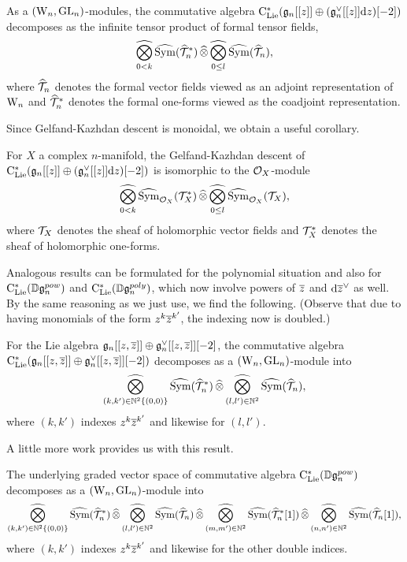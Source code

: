 \begin{lemma}
As a $({{\rm W}_n},{\rm GL}_n)$-modules, the commutative algebra ${\rm C}_{\rm Lie}^*(\mathfrak{g}_n[[z]] \oplus (\mathfrak{g}_n^\vee[[z]]{\rm d} z)[-2])$ 
decomposes as the infinite tensor product of formal tensor fields,
\[
\underset{{0<k}}{\widehat{\bigotimes}}\,\widehat{{\rm Sym}}(\widehat{\mathcal T}^*_n)\, \widehat{\otimes}\, \underset{{0\leq l}}{\widehat{\bigotimes}}\,\widehat{{\rm Sym}}(\widehat{\mathcal T}_n),
\]
where $\widehat{\mathcal T}_n$ denotes the formal vector fields viewed as an adjoint representation of ${{\rm W}_n}$ and 
$\widehat{\mathcal T}^*_n$ denotes the formal one-forms viewed as the coadjoint representation.
\end{lemma}

Since Gelfand-Kazhdan descent is monoidal, we obtain a useful corollary.

\begin{cor}
\label{lem g[[z]]}
For $X$ a complex $n$-manifold, the Gelfand-Kazhdan descent of ${\rm C}_{\rm Lie}^*(\mathfrak{g}_n[[z]] \oplus (\mathfrak{g}_n^\vee[[z]]{\rm d} z)[-2])$
is isomorphic to the $\mathcal O_X$-module
\[
\underset{{0<k}}{\widehat{\bigotimes}}\,\widehat{{\rm Sym}}_{\mathcal O_X}(\mathcal T^*_X)\, \widehat{\otimes}\, \underset{{0\leq l}}{\widehat{\bigotimes}}\,\widehat{{\rm Sym}}_{\mathcal O_X}(\mathcal T_X),
\]
where $\mathcal T_X$ denotes the sheaf of holomorphic vector fields and $\mathcal T^*_X$ denotes the sheaf of holomorphic one-forms.
\end{cor}

Analogous results can be formulated for the polynomial situation 
and also for ${\rm C}_{\rm Lie}^*(\mathbb D\mathfrak{g}_n^{pow})$ and ${\rm C}_{\rm Lie}^*(\mathbb D\mathfrak{g}_n^{poly})$,
which now involve powers of $\overline{z}$ and ${\rm d} \overline{z}^\vee$ as well.
By the same reasoning as we just use, we find the following.
(Observe that due to having monomials of the form $z^k \overline{z}^{k'}$,
the indexing now is doubled.)

\begin{lemma}
For the Lie algebra $\mathfrak{g}_n[[z,\overline{z}]] \oplus \mathfrak{g}_n^\vee[[z,\overline{z}]][-2]$,
the commutative algebra ${\rm C}_{\rm Lie}^*(\mathfrak{g}_n[[z,\overline{z}]] \oplus \mathfrak{g}_n^\vee[[z,\overline{z}]][-2])$ decomposes as a $({{\rm W}_n},{\rm GL}_n)$-module
into
\[
\underset{{(k,k') \in \mathbb N^2 \{(0,0)\}}}{\widehat{\bigotimes}}\,\widehat{{\rm Sym}}(\widehat{\mathcal T}_n^*)\, \widehat{\otimes}\, \underset{{(l,l') \in \mathbb N^2}}{\widehat{\bigotimes}}\,\widehat{{\rm Sym}}(\widehat{\mathcal T}_n),
\]
where $(k,k')$ indexes $z^k \overline{z}^{k'}$ and likewise for $(l,l')$.
\end{lemma}

A little more work provides us with this result.

\begin{lemma}
\label{lem DDfgn^pow}
The underlying graded vector space of commutative algebra ${\rm C}_{\rm Lie}^*(\mathbb D\mathfrak{g}_n^{pow})$ decomposes as a $({{\rm W}_n},{\rm GL}_n)$-module into
\[
\underset{{(k,k') \in \mathbb N^2 \{(0,0)\}}}{\widehat{\bigotimes}}\,\widehat{{\rm Sym}}(\widehat{\mathcal T}_n^*)\, \widehat{\otimes}\,
\underset{{(l,l') \in \mathbb N^2}}{\widehat{\bigotimes}}\,\widehat{{\rm Sym}}(\widehat{\mathcal T}_n) \, \widehat{\otimes}\, 
\underset{{(m,m') \in \mathbb N^2}}{\widehat{\bigotimes}}\,\widehat{{\rm Sym}}(\widehat{\mathcal T}_n^*[1])\, \widehat{\otimes}\, 
\underset{{(n,n') \in \mathbb N^2}}{\widehat{\bigotimes}}\,\widehat{{\rm Sym}}(\widehat{\mathcal T}_n[1]),
\]
where $(k,k')$ indexes $z^k \overline{z}^{k'}$ and likewise for the other double indices.
\end{lemma}


